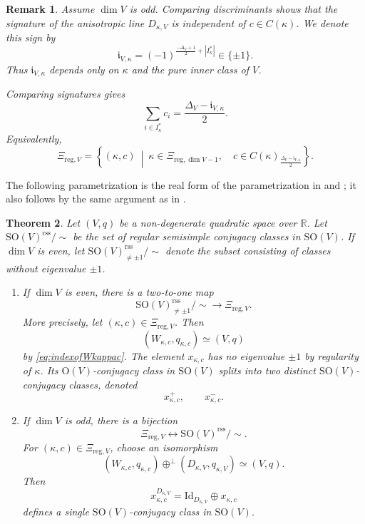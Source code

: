 \documentclass[12pt]{amsart}
\numberwithin{equation}{subsection}
\newcommand{\BR}{{\mathbb {R}}}
\newcommand{\Fi}{{\mathfrak {i}}}
\newcommand{\Id}{{\mathrm{Id}}}
\newcommand{\reg}{{\mathrm{reg}}}
\newcommand{\SO}{{\mathrm{SO}}}
\def\Del{{\Delta}}
\def\rss{\mathrm{rss}}
\def\SO{\mathrm{SO}}
\newtheorem{thm}{Theorem}[subsection]
\newtheorem{rmk}[thm]{Remark}
\begin{document}
\begin{rmk}\label{rmk:afterdefparconj}
Assume $\dim V$ is odd. Comparing discriminants shows that the signature of the
anisotropic line $D_{\kappa,V}$ is independent of $c\in C(\kappa)$. We denote
this sign by
\begin{equation}\label{eq:definoffraki}
\Fi_{V,\kappa}
=
(-1)^{
\frac{-\Del_V+1}{2}+|I_\kappa^*|
}
\in \{\pm 1\}.
\end{equation}
Thus $\Fi_{V,\kappa}$ depends only on $\kappa$ and the pure inner class of
$V$.

Comparing signatures gives
\[
\sum_{i\in I^*_\kappa}c_i
=
\frac{\Del_V-\Fi_{V,\kappa}}{2}.
\]
Equivalently,
\begin{equation}\label{eq:xiregValternative}
\Xi_{\reg,V}
=
\left\{
(\kappa,c)
\ \middle|\
\kappa\in \Xi_{\reg,\dim V-1},\quad
c\in C(\kappa)_{\frac{\Del_V-\Fi_{V,\kappa}}{2}}
\right\}.
\end{equation}
\end{rmk}

The following parametrization is the real form of the parametrization in
\cite[\S 1.3]{MR2672539} and \cite[\S 1.3, \S 1.4]{MR3155345}; it also follows
by the same argument as in \cite[\S 5.1]{thesis_zhilin}.

\begin{thm}\label{thm:parconjso}
Let $(V,q)$ be a non-degenerate quadratic space over $\BR$. Let
$\SO(V)^\rss/\sim$ be the set of regular semisimple conjugacy classes in
$\SO(V)$. If $\dim V$ is even, let
$\SO(V)^\rss_{\neq \pm 1}/\sim$ denote the subset consisting of classes without
eigenvalue $\pm 1$.

\begin{enumerate}
\item
If $\dim V$ is even, there is a two-to-one map
\[
\SO(V)^\rss_{\neq \pm 1}/\sim
\longrightarrow
\Xi_{\reg,V}.
\]
More precisely, let $(\kappa,c)\in \Xi_{\reg,V}$. Then
\[
(W_{\kappa,c},q_{\kappa,c})\simeq (V,q)
\]
by \eqref{eq:indexofWkappac}. The element $x_{\kappa,c}$ has no eigenvalue
$\pm 1$ by regularity of $\kappa$. Its $\mathrm{O}(V)$-conjugacy class in
$\SO(V)$ splits into two distinct $\SO(V)$-conjugacy classes, denoted
\[
x_{\kappa,c}^+,\qquad x_{\kappa,c}^-.
\]

\item
If $\dim V$ is odd, there is a bijection
\[
\Xi_{\reg,V}
\longleftrightarrow
\SO(V)^\rss/\sim.
\]
For $(\kappa,c)\in \Xi_{\reg,V}$, choose an isomorphism
\[
(W_{\kappa,c},q_{\kappa,c})
\oplus^\perp
(D_{\kappa,V},q_{\kappa,V})
\simeq
(V,q).
\]
Then
\[
x_{\kappa,c}^{D_{\kappa,V}}
=
\Id_{D_{\kappa,V}}\oplus x_{\kappa,c}
\]
defines a single $\SO(V)$-conjugacy class in $\SO(V)$.
\end{enumerate}
\end{thm}
\end{document}
